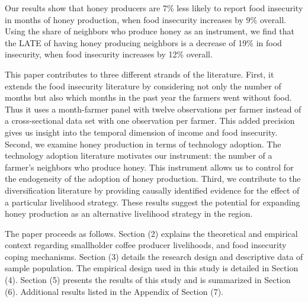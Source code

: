 \documentclass[../main.tex]{subfiles}
\begin{document}
Our results show that honey producers are 7\% less likely to report food insecurity in months of honey production, when food insecurity increases by 9\% overall. Using the share of neighbors who produce honey as an instrument, we find that the LATE of having honey producing neighbors is a decrease of 19\% in food insecurity, when food insecurity increases by 12\% overall. 

This paper contributes to three different strands of the literature. First, it extends the food insecurity literature by considering not only the number of months but also which months in the past year the farmers went without food. Thus it uses a month-farmer panel with twelve observations per farmer instead of a cross-sectional data set with one observation per farmer. This added precision gives us insight into the temporal dimension of income and food insecurity. Second, we examine honey production in terms of technology adoption. The technology adoption literature motivates our instrument: the number of a farmer's neighbors who produce honey. This instrument allows us to control for the endogeneity of the adoption of honey production. Third, we contribute to the diversification literature by providing causally identified evidence for the effect of a particular livelihood strategy. These results suggest the potential for expanding honey production as an alternative livelihood strategy in the region. 
 
The paper proceeds as follows. Section (2) explains the theoretical and empirical context regarding smallholder coffee producer livelihoods, and food insecurity coping mechanisms. Section (3) details the research design and descriptive data of sample population. The empirical design used in this study is detailed in Section (4). Section (5) presents the results of this study and is summarized in Section (6). Additional results listed in the Appendix of Section (7).
\end{document}
